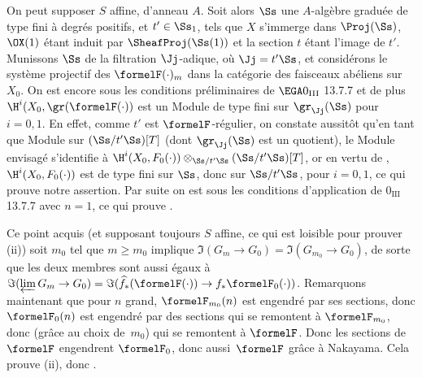 On peut supposer $S$ affine, d'anneau $A$. Soit alors $\Ss$ une $A$-alg\`ebre gradu\'ee de type fini \`a degr\'es positifs, et $t'\in\Ss_1$, tels que $X$ s'immerge dans $\Proj(\Ss)$, $\OX(1)$ \'etant induit par $\SheafProj(\Ss(1))$ et la section $t$ \'etant l'image de $t'$. Munissons $\Ss$ de la filtration $\Jj$-adique, o\`u $\Jj=t'\Ss$, et consid\'erons le syst\`eme projectif des $\formelF(\cdot)_m$ dans la cat\'egorie des faisceaux ab\'eliens sur $X_0$. On est encore sous les conditions pr\'eliminaires de $\EGA 0_{\textup{III}}$ 13.7.7 et de plus $\H^i(X_0, \gr(\formelF(\cdot))$ est un Module de type fini sur $\gr_\Jj(\Ss)$ pour $i=0, 1$. En effet, comme $t'$ est $\formelF$-r\'egulier, on constate aussit\^{o}t qu'en tant que Module sur $(\Ss /t'\Ss)[T]$ (dont $\gr_\Jj(\Ss)$ est un quotient), le Module envisag\'e s'identifie \`a $\H^i(X_0, F_0(\cdot))\otimes_{\Ss /t'\Ss}(\Ss /t'\Ss)[T]$, or en vertu de , $\H^i(X_0, F_0(\cdot))$ est de type fini sur $\Ss$, donc sur $\Ss /t'\Ss$, pour $i=0, 1$, ce qui prouve notre assertion. Par suite on est sous les conditions d'application de $0_{\text{III}}$ 13.7.7 avec $n=1$, ce qui prouve .

Ce point acquis (et supposant toujours $S$ affine, ce qui est loisible pour prouver  (ii)) soit $m_0$ tel que $m\geq m_0$ implique $\Im(G_m\to G_0)= \Im(G_{m_0}\to G_0)$, de sorte que les deux membres sont aussi \'egaux \`a $\Im(\varprojlim G_m\to G_0) = \Im(\widehat{f}_\ast(\formelF(\cdot))\to f_\ast\formelF_0(\cdot))$. Remarquons maintenant que pour $n$ grand, $\formelF_{m_0}(n)$ est engendr\'e par ses sections, donc $\formelF_0(n)$ est engendr\'e par des sections qui se remontent \`a $\formelF_{m_0}$, donc (gr\^ace au choix de~$m_0$) qui se remontent \`a $\formelF$. Donc les sections de $\formelF$ engendrent $\formelF_0$, donc aussi~$\formelF$ gr\^ace \`a Nakayama. Cela prouve  (ii), donc .

